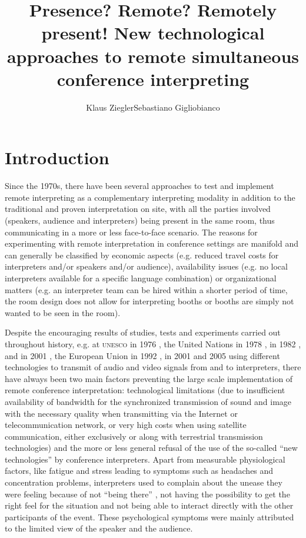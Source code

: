 \documentclass[output=paper]{langsci/langscibook}
\author{Klaus Ziegler\affiliation{AIIC Technical Committee}\lastand Sebastiano Gigliobianco\affiliation{SDI München}}
\title{Presence? Remote? Remotely present! New technological approaches to remote simultaneous conference interpreting}
\begin{document}
\section{Introduction}
\largerpage
\label{sec:ziegler:01}
Since the 1970s, there have been several approaches to test and implement remote interpreting as a complementary interpreting modality in addition to the traditional and proven interpretation on site, with all the parties involved (speakers, audience and interpreters) being present in the same room, thus communicating in a more or less face-to-face scenario. The reasons for experimenting with remote interpretation in conference settings are manifold and can generally be classified by economic aspects (e.g. reduced travel costs for interpreters and/or speakers and/or audience), availability issues (e.g. no local interpreters available for a specific language combination) or organizational matters (e.g. an interpreter team can be hired within a shorter period of time, the room design does not allow for interpreting booths or booths are simply not wanted to be seen in the room). 

Despite the encouraging results of studies, tests and experiments carried out throughout history, e.g. at \textsc{unesco} in 1976 \citep{Kurz2000}, the United Nations in 1978 \citep{Chernov2004}, in 1982 \citep{UNESCO1987}, and in 2001 \citep{Mouzourakis2006}, the European Union in 1992 \citep{Kurz2000}, in 2001 \citep{Europarl2001} and 2005 \citep{Roziner2010} using different technologies to transmit of audio and video signals from and to interpreters, there have always been two main factors preventing the large scale implementation of remote conference interpretation: technological limitations (due to insufficient availability of bandwidth for the synchronized transmission of sound and image with the necessary quality when transmitting via the Internet or telecommunication network, or very high costs when using satellite communication, either exclusively or along with terrestrial transmission technologies) and the more or less general refusal of the use of the so-called “new technologies” by conference interpreters. Apart from measurable physiological factors, like fatigue and stress leading to symptoms such as headaches and concentration problems, interpreters used to complain about the unease they were feeling because of not “being there” \cite[56]{Mouzourakis2006}, not having the possibility to get the right feel for the situation and not being able to interact directly with the other participants of the event. These psychological symptoms were mainly attributed to the limited view of the speaker and the audience.
\end{document}
